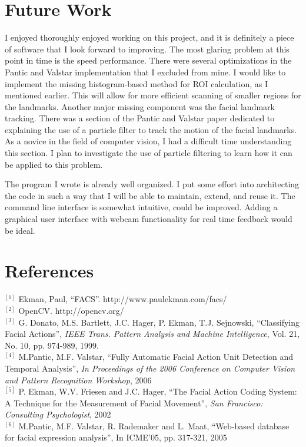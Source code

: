 \documentclass[13pt,letterpaper]{scrartcl}
\begin{document}
	\section{Future Work}
	I enjoyed thoroughly enjoyed working on this project, and it is definitely a piece of software that I look forward to improving. The most glaring problem at this point in time is the speed performance. There were several optimizations in the Pantic and Valstar implementation that I excluded from mine. I would like to implement the missing histogram-based method for ROI calculation, as I mentioned earlier. This will allow for more efficient scanning of smaller regions for the landmarks. Another major missing component was the facial landmark tracking. There was a section of the Pantic and Valstar paper dedicated to explaining the use of a particle filter to track the motion of the facial landmarks. As a novice in the field of computer vision, I had a difficult time understanding this section. I plan to investigate the use of particle filtering to learn how it can be applied to this problem.
	
	The program I wrote is already well organized. I put some effort into architecting the code in such a way that I will be able to maintain, extend, and reuse it. The command line interface is somewhat intuitive, could be improved. Adding a graphical user interface with webcam functionality for real time feedback would be ideal.
	
	\section{References}
	$^{[1]}$ Ekman, Paul, “FACS”. http://www.paulekman.com/facs/ \\
	$^{[2]}$ OpenCV. http://opencv.org/ \\
	$^{[3]}$ G. Donato, M.S. Bartlett, J.C. Hager, P. Ekman, T.J. Sejnowski,
“Classifying Facial Actions”, \textit{IEEE Trans. Pattern Analysis and
Machine Intelligence}, Vol. 21, No. 10, pp. 974-989, 1999.  \\
	$^{[4]}$ M.Pantic, M.F. Valstar, “Fully Automatic Facial Action Unit Detection and Temporal Analysis”, \textit{In Proceedings of the 2006 Conference on Computer Vision and Pattern Recognition Workshop}, 2006 \\
	$^{[5]}$ P. Ekman, W.V. Friesen and J.C. Hager, “The Facial Action Coding
System: A Technique for the Measurement of Facial Movement”, \textit{San Francisco: Consulting Psychologist}, 2002 \\
	$^{[6]}$ M.Pantic, M.F. Valstar, R. Rademaker and L. Maat, “Web-based database for facial expression analysis”, In ICME’05, pp. 317-321, 2005 \\
\end{document}
